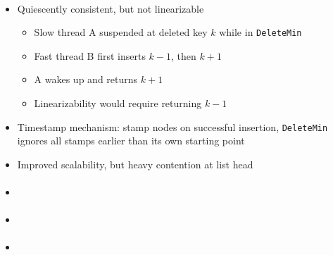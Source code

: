 \documentclass[usenames,dvipsnames]{beamer}
\begin{document}
\begin{frame}{}
\framesubtitle{\citeauthor{shavit2000skiplist}}

\begin{itemize}
\item Quiescently consistent, but not linearizable
    \begin{itemize}
    \item Slow thread A suspended at deleted key $k$ while in \lstinline|DeleteMin|
    \item Fast thread B first inserts $k-1$, then $k+1$
    \item A wakes up and returns $k+1$
    \item Linearizability would require returning $k-1$
    \end{itemize}

\item Timestamp mechanism: stamp nodes on successful insertion,
      \lstinline|DeleteMin| ignores all stamps earlier than its own starting point
\item Improved scalability, but heavy contention at list head
\end{itemize}
\end{frame}

\begin{frame}{}
\framesubtitle{\citeauthor{sundell2003fast}}
\begin{itemize}
\item
\end{itemize}
\end{frame}

\begin{frame}{}
\framesubtitle{\citeauthor{linden2013skiplist}}

\begin{itemize}
\item
\end{itemize}
\end{frame}

\begin{frame}{}
\framesubtitle{\citeauthor{linden2013skiplist}}

\begin{itemize}
\item
\end{itemize}
\end{frame}

\end{document}
